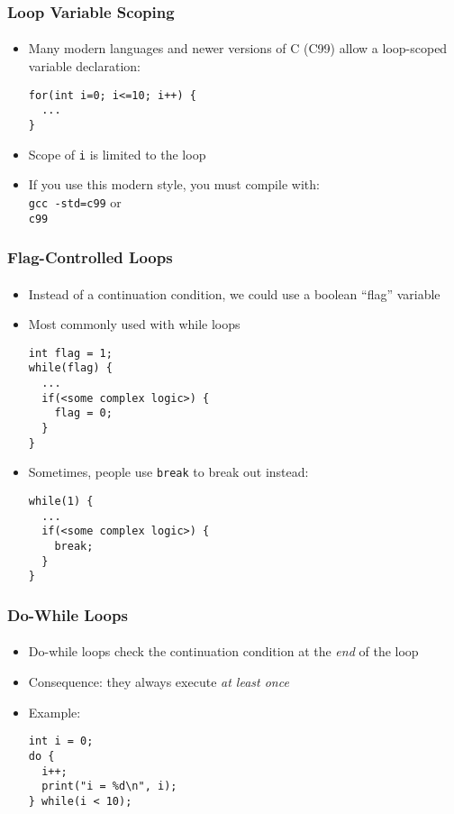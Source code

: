 \documentclass[]{beamer}
\begin{document}
\begin{frame}[fragile]
  \frametitle{Loop Variable Scoping}
  \framesubtitle{}

\begin{itemize}[<+->]
  \item Many modern languages and newer versions of C (C99) allow a loop-scoped
  variable declaration:
\begin{verbatim}
for(int i=0; i<=10; i++) {
  ...
}
\end{verbatim}  
  \item Scope of \texttt{i} is limited to the loop
  \item If you use this modern style, you must compile with: \\
  \texttt{gcc -std=c99} or \\
  \texttt{c99}
\end{itemize}
\end{frame}

\begin{frame}[fragile]
  \frametitle{Flag-Controlled Loops}
  \framesubtitle{}

\begin{itemize}[<+->]
  \item Instead of a continuation condition, we could use a boolean ``flag'' variable
  \item Most commonly used with while loops
\begin{verbatim}
int flag = 1;
while(flag) {
  ...
  if(<some complex logic>) {
    flag = 0;
  }
}
\end{verbatim}
  \item Sometimes, people use \texttt{break} to break out instead:
\begin{verbatim}
while(1) {
  ...
  if(<some complex logic>) {
    break;
  }
}
\end{verbatim}
\end{itemize}
\end{frame}

 
\begin{frame}[fragile]
  \frametitle{Do-While Loops}
  \framesubtitle{}

\begin{itemize}[<+->]
  \item Do-while loops check the continuation condition at the \emph{end} of the loop
  \item Consequence: they always execute \emph{at least once}
  \item Example:
\begin{verbatim}
int i = 0;
do {
  i++;
  print("i = %d\n", i);
} while(i < 10);
\end{verbatim}
\end{itemize}

\end{frame}
\end{document}
